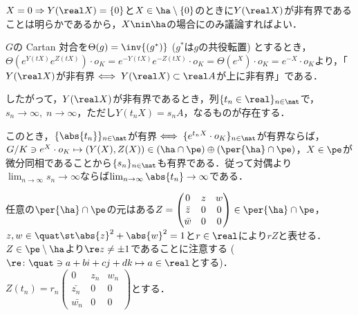 \begin{pfwn}{}
  
  $X = 0\Rightarrow Y(\real X) = \{0\} $と$X\in \ha\setminus\{0\} $のときに$Y(\real X) $が非有界であることは明らかであるから，$X\nin \ha $の場合にのみ議論すればよい．%

  $G$の Cartan 対合を$\Theta(g) = \inv{(g^{*})} $ ($g^{*}$は$g$の共役転置) とするとき，$\Theta(e^{Y(tX)}e^{Z(tX)})\cdot o_K = e^{-Y(tX)}e^{-Z(tX)}\cdot o_K = \Theta(e^{X})\cdot o_K = e^{-X}\cdot o_K $より，「$Y(\real X) $が非有界$\iff Y(\real X)\subset \real A $が上に非有界」である．

  したがって，$Y (\real X) $が非有界であるとき，列$\{t_n \in \real \}_{n\in \nat} $で，$s_n\to \infty,\; n\to \infty$，ただし$Y(t_n X) = s_nA$，なるものが存在する．

  このとき，$\{\abs{t_n}\}_{n\in \nat}$が有界$\iff \{e^{t_n X}\cdot o_K\}_{n\in \nat}  $が有界ならば，$G/K\ni e^{X}\cdot o_K\mapsto (Y(X), Z(X))\in (\ha\cap \pe)\oplus (\per{\ha}\cap \pe) $，$X\in \pe$が微分同相であることから$\{s_n\}_{n\in \nat} $も有界である．従って対偶より$\lim_{n\to\infty}s_n\to \infty $ならば$\lim_{n\to \infty}\abs{t_n}\to \infty $である．

  任意の$\per{\ha}\cap\pe $の元はある$Z =
  \begin{pmatrix}
    0 & z & w \\
    \bar{z} & 0 & 0 \\
    \bar{w} & 0 & 0 
  \end{pmatrix} \in \per{\ha}\cap\pe $，$z,w\in \quat \st \abs{z}^2 +\abs{w}^2  = 1 $と$r\in \real$により$rZ$と表せる．$Z\in\pe\setminus \ha $より$\re z \neq \pm 1$であることに注意する ($\re\colon \quat\ni a+bi+cj+dk\mapsto a\in \real$とする)．$Z(t_n) = r_n\begin{pmatrix}
    0 & z_n & w_n \\
    \bar{z_n} & 0 & 0 \\
    \bar{w_n} & 0 & 0 
  \end{pmatrix} $とする．


\end{pfwn}
